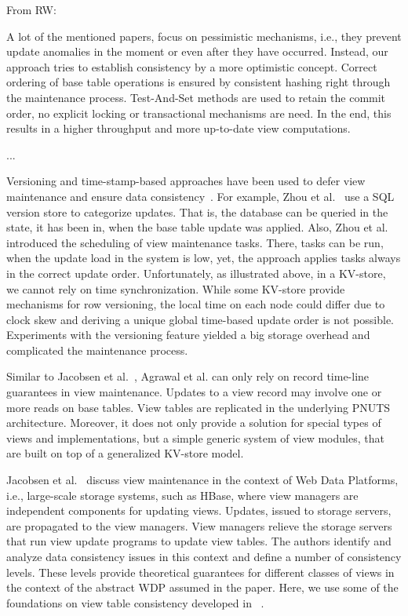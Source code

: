 

From RW:

A lot of the mentioned papers, focus on pessimistic mechanisms, i.e., 
they prevent update anomalies in the moment or even after they have 
occurred. Instead, our approach tries to establish consistency by a more 
optimistic concept. Correct ordering of base table operations is ensured 
by consistent hashing right through the maintenance process. 
Test-And-Set methods are used to retain the commit order, no explicit 
locking or transactional mechanisms are need. In the end, this results 
in a higher throughput and more up-to-date view computations. 


...

Versioning and time-stamp-based approaches have been used to defer view 
maintenance and ensure data consistency~\cite{salem:how, zhou:lazy}. For 
example, Zhou et al.~\cite{zhou:lazy} use a SQL version store to 
categorize updates. That is, the database can be queried in the state, 
it has been in, when the base table update was applied. Also, Zhou et 
al.~\cite{zhou:lazy} introduced the scheduling of view maintenance 
tasks. There, tasks can be run, when the update load in the system is 
low, yet, the approach applies tasks always in the correct update order. 
Unfortunately, as illustrated above, in a KV-store, we cannot rely on 
time synchronization. While some KV-store provide mechanisms for row 
versioning, the local time on each node could differ due to clock skew 
and deriving a unique global time-based update order is not possible. 
Experiments with the versioning feature yielded a big storage overhead 
and complicated the maintenance process. 

Similar to Jacobsen et al.~\cite{jacobsen:viewmaintenance}, Agrawal et
al. can only rely on record time-line guarantees in view
maintenance. Updates to a view record may involve one or more reads on
base tables. View tables are replicated in the underlying PNUTS
architecture. Moreover, it does not only provide a solution for
special types of views and implementations, but a simple generic
system of view modules, that are built on top of a generalized
KV-store model.



Jacobsen et al.~\cite{jacobsen:viewmaintenance } discuss view
maintenance in the context of Web Data Platforms, i.e., large-scale
storage systems, such as HBase, where view managers are independent
components for updating views. Updates, issued to storage servers, are
propagated to the view managers. View managers relieve the storage
servers that run view update programs to update view tables. The
authors identify and analyze data consistency issues in this context
and define a number of consistency levels. These levels provide
theoretical guarantees for different classes of views in the context
of the abstract WDP assumed in the paper. Here, we use some of the
foundations on view table consistency developed in
~\cite{jacobsen:viewmaintenance}.

